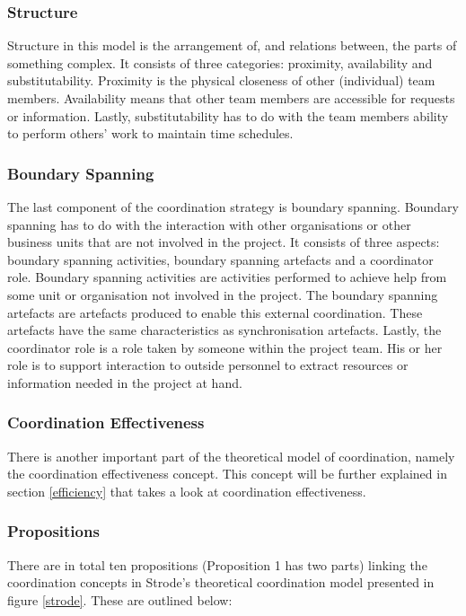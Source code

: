 \subsubsection{Structure}

Structure in this model is the arrangement of, and relations between, the parts of something complex. It consists of three categories: proximity, availability and substitutability. Proximity is the physical closeness of other (individual) team members. Availability means that other team members are accessible for requests or information. Lastly, substitutability has to do with the team members ability to perform others' work to maintain time schedules.

\subsubsection{Boundary Spanning}

The last component of the coordination strategy is boundary spanning. Boundary spanning has to do with the interaction with other organisations or other business units that are not involved in the project. It consists of three aspects: boundary spanning activities, boundary spanning artefacts and a coordinator role. Boundary spanning activities are activities performed to achieve help from some unit or organisation not involved in the project. The boundary spanning artefacts are artefacts produced to enable this external coordination. These artefacts have the same characteristics as synchronisation artefacts. Lastly, the coordinator role is a role taken by someone within the project team. His or her role is to support interaction to outside personnel to extract resources or information needed in the project at hand.

\subsubsection{Coordination Effectiveness}
\label{strode_ce}

There is another important part of the theoretical model of coordination, namely the coordination effectiveness concept. This concept will be further explained in section \ref{efficiency} that takes a look at coordination effectiveness.

\subsubsection{Propositions}

There are in total ten propositions (Proposition 1 has two parts) linking the coordination concepts in Strode's theoretical coordination model presented in figure \ref{strode}. These are outlined below:

